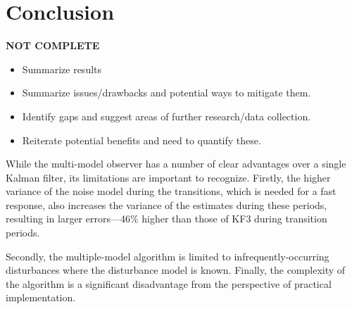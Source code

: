 \chapter*{Conclusion}           %
\label{chap-conclusion}         %

\textbf{NOT COMPLETE}

\begin{itemize}
	\item Summarize results
	\item Summarize issues/drawbacks and potential ways to mitigate them.
	\item Identify gaps and suggest areas of further research/data collection.
	\item Reiterate potential benefits and need to quantify these.
\end{itemize}

While the multi-model observer has a number of clear advantages over a single Kalman filter, its limitations are important to recognize. Firstly, the higher variance of the noise model during the transitions, which is needed for a fast response, also increases the variance of the estimates during these periods, resulting in larger errors---46\% higher than those of KF3 during transition periods.

Secondly, the multiple-model algorithm is limited to infrequently-occurring disturbances where the disturbance model is known. Finally, the complexity of the algorithm is a significant disadvantage from the perspective of practical implementation.




